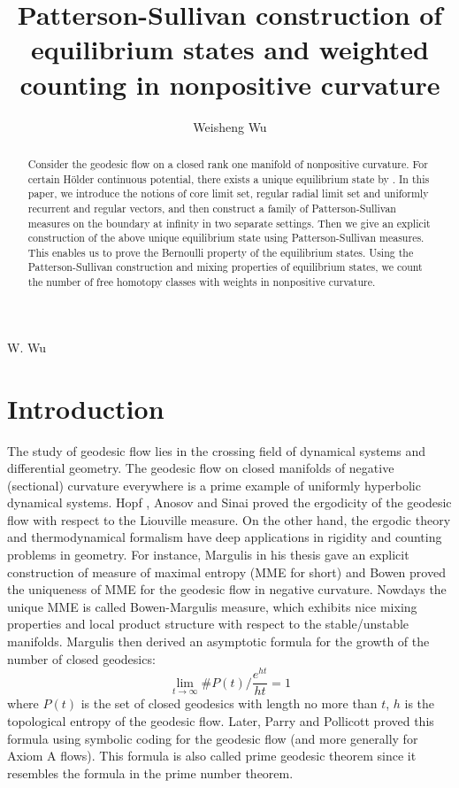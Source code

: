 \documentclass[11pt]{amsart}
\title[Running heading with forty characters or less]
      {Patterson-Sullivan construction of equilibrium states and weighted counting in nonpositive curvature}
\author[first-name1 last-name1 and first-name2 last-name2]{Weisheng Wu}
\theoremstyle{definition}
\begin{document}
\begin{abstract}
Consider the geodesic flow on a closed rank one manifold of nonpositive curvature. For certain H\"{o}lder continuous potential, there exists a unique equilibrium state by \cite{BCFT}. In this paper, we introduce the notions of core limit set, regular radial limit set and uniformly recurrent and regular vectors, and then construct a family of Patterson-Sullivan measures on the boundary at infinity in two separate settings. Then we give an explicit construction of the above unique equilibrium state using Patterson-Sullivan measures. This enables us to prove the Bernoulli property of the equilibrium states. Using the Patterson-Sullivan construction and mixing properties of equilibrium states, we count the number of free homotopy classes with weights in nonpositive curvature.  
\end{abstract}

\maketitle
{}
{W. Wu}
\renewcommand{\sectionmark}[1]{}


\tableofcontents

\section{Introduction}
The study of geodesic flow lies in the crossing field of dynamical systems and differential geometry. The geodesic flow on closed manifolds of negative (sectional) curvature everywhere is a prime example of uniformly hyperbolic dynamical systems. Hopf \cite{Ho0, Ho1}, Anosov and Sinai \cite{An, AnS} proved the ergodicity of the geodesic flow with respect to the Liouville measure. On the other hand, the ergodic theory and thermodynamical formalism have deep applications in rigidity and counting problems in geometry. For instance, Margulis in his thesis \cite{Mar2} gave an explicit construction of measure of maximal entropy (MME for short) and Bowen \cite{Bo2} proved the uniqueness of MME for the geodesic flow in negative curvature. Nowdays the unique MME is called Bowen-Margulis measure, which exhibits nice mixing properties and local product structure with respect to the stable/unstable manifolds. Margulis \cite{Mar2} then derived an asymptotic formula for the growth of the number of closed geodesics:
\begin{equation*}
 \lim_{t\to \infty}\#P(t)/\frac{e^{ht}}{ht}=1
\end{equation*}
where $P(t)$ is the set of closed geodesics with length no more than $t$, $h$ is the topological entropy of the geodesic flow. Later, Parry and Pollicott \cite{PP} proved this formula using symbolic coding for the geodesic flow (and more generally for Axiom A flows). This formula is also called prime geodesic theorem since it resembles the formula in the prime number theorem.     
\end{document}
